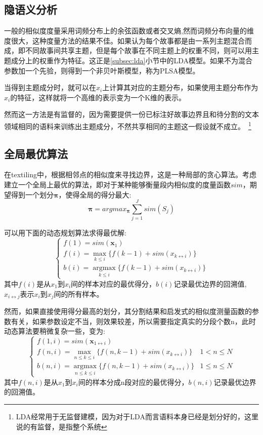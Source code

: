 \subsection{隐语义分析}
一般的相似度度量采用词频分布上的余弦函数或者交叉熵,然而词频分布向量的维度很大，这种度量方法的结果不佳。如果认为每个故事都是由一系列主题混合而成，即不同故事间共享主题，但是每个故事在不同主题上的权重不同，则可以用主题成分上的权重作为特征。这正是\ref{subsec:lda}小节中的LDA模型。如果不为混合参数加一个先验，则得到一个非贝叶斯模型，称为PLSA模型。

当得到主题成分时，就可以在$x_i$上计算其对应的主题分布，如果使用主题分布作为$x_i$的特征，这样就将一个高维的表示变为一个K维的表示。

然而这一方法是有监督的，因为需要提供一份已标注好故事边界且和待分割的文本领域相同的语料来训练出主题成分，不然共享相同的主题这一假设就不成立。~\footnote{LDA经常用于无监督建模，因为对于LDA而言语料本身已经是划分好的，这里说的有监督，是指整个系统}

\subsection{全局最优算法}
在textiling中，根据相邻点的相似度来寻找边界，这是一种局部的贪心算法。考虑建立一个全局上最优的算法，即对于某种能够衡量段内相似度的度量函数$sim$，期望得到一个划分${\bm \pi}$，使得全局的得分最大:
\begin{equation}
{\bm \pi} = argmax_{\bm \pi}{\sum_{j=1}^{J}{sim({S}_j)}}
\end{equation} 

可以用下面的动态规划算法求得最优解:
\begin{equation}
\left\{
\begin{array}{l}
f(1) = sim({\bm x}_{1})\\
f(i) = \mathop{\max}\limits_{k\leq i}\{f(k-1)+sim({x}_{k\leftrightarrow i})\} \\
b(i) = \mathop{\arg\max}\limits_{k\leq i}{\{f(k-1)+sim({x}_{k\leftrightarrow i})\}}
\end{array}
\right.
\end{equation}
其中$f(i)$是从$x_1$到$x_i$间的样本对应的最优得分，$b(i)$记录最优边界的回溯值,${x}_{i\leftrightarrow j}$表示$x_i$到$x_j$间的所有样本。

然而，如果直接使用得分最高的划分，其分割结果和启发式的相似度测量函数的参数有关，如果参数设定不当，则效果较差，所以需要指定真实的分段个数n，此时动态算法要稍微复杂一些，变为:
\begin{equation}
\left\{
\begin{array}{ll}
f(1,i) = sim({\bm x}_{1 \leftrightarrow i})& \\
f(n,i) = \mathop{\max}\limits_{n\leq k\leq i}\{f(n,k-1)+sim({x}_{k\leftrightarrow i})\}  & 1 < n \leq N \\
b(n,i) = \mathop{\arg\max}\limits_{n\leq k\leq i}{\{f(n,k-1)+sim({x}_{k\leftrightarrow i})\}}  & 1 \leq n \leq N
\end{array}
\right.
\end{equation}
其中$f(n,i)$是从$x_1$到$x_i$间的样本分成n段对应的最优得分，$b(n,i)$记录最优边界的回溯值。

